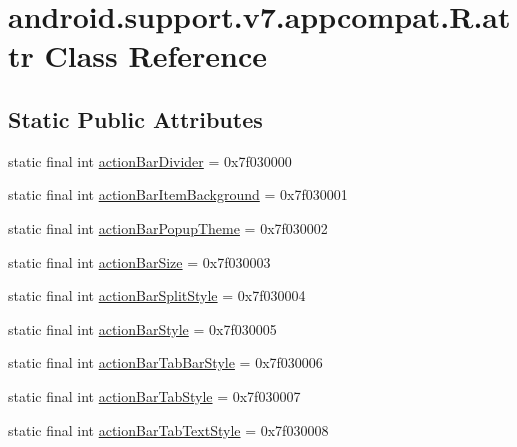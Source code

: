 \hypertarget{classandroid_1_1support_1_1v7_1_1appcompat_1_1_r_1_1attr}{}\section{android.\+support.\+v7.\+appcompat.\+R.\+attr Class Reference}
\label{classandroid_1_1support_1_1v7_1_1appcompat_1_1_r_1_1attr}
\subsection*{Static Public Attributes}
\begin{DoxyCompactItemize}
\item 
static final int \mbox{\hyperlink{classandroid_1_1support_1_1v7_1_1appcompat_1_1_r_1_1attr_ac6a2c7ce44a2166d7e14504e8190c672}{action\+Bar\+Divider}} = 0x7f030000
\item 
static final int \mbox{\hyperlink{classandroid_1_1support_1_1v7_1_1appcompat_1_1_r_1_1attr_ace1846ddd415909e0bae74f1522ac978}{action\+Bar\+Item\+Background}} = 0x7f030001
\item 
static final int \mbox{\hyperlink{classandroid_1_1support_1_1v7_1_1appcompat_1_1_r_1_1attr_a7e95d0cc1919198b7bf4225527179c2d}{action\+Bar\+Popup\+Theme}} = 0x7f030002
\item 
static final int \mbox{\hyperlink{classandroid_1_1support_1_1v7_1_1appcompat_1_1_r_1_1attr_a6c7ea35aa7f4c203811b01339aba964e}{action\+Bar\+Size}} = 0x7f030003
\item 
static final int \mbox{\hyperlink{classandroid_1_1support_1_1v7_1_1appcompat_1_1_r_1_1attr_ae16c62a7c9c666348989192343ce0449}{action\+Bar\+Split\+Style}} = 0x7f030004
\item 
static final int \mbox{\hyperlink{classandroid_1_1support_1_1v7_1_1appcompat_1_1_r_1_1attr_a1758457942ab79be3d337a155a829ee7}{action\+Bar\+Style}} = 0x7f030005
\item 
static final int \mbox{\hyperlink{classandroid_1_1support_1_1v7_1_1appcompat_1_1_r_1_1attr_a81b7cc97e9d9c6c5651f9606d0da5d01}{action\+Bar\+Tab\+Bar\+Style}} = 0x7f030006
\item 
static final int \mbox{\hyperlink{classandroid_1_1support_1_1v7_1_1appcompat_1_1_r_1_1attr_ae81eb3b3a822263968720a2735a40e47}{action\+Bar\+Tab\+Style}} = 0x7f030007
\item 
static final int \mbox{\hyperlink{classandroid_1_1support_1_1v7_1_1appcompat_1_1_r_1_1attr_ab4fe4a0bc0d16f45089e72120dfef1e2}{action\+Bar\+Tab\+Text\+Style}} = 0x7f030008

\end{DoxyCompactItemize}
